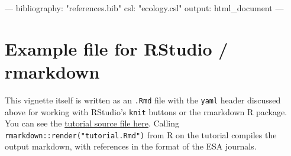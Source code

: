 \documentclass[]{article}
\newenvironment{Shaded}{\begin{snugshade}}{\end{snugshade}}
\newcommand{\StringTok}[1]{\textcolor[rgb]{0.31,0.60,0.02}{{#1}}}
\newcommand{\OtherTok}[1]{\textcolor[rgb]{0.56,0.35,0.01}{{#1}}}
\newcommand{\FunctionTok}[1]{\textcolor[rgb]{0.00,0.00,0.00}{{#1}}}
\newcommand{\NormalTok}[1]{{#1}}
\begin{document}
\begin{Shaded}
\begin{Highlighting}[]
\OtherTok{---}
\FunctionTok{bibliography:} \StringTok{"references.bib"}
\FunctionTok{csl:} \StringTok{"ecology.csl"}
\FunctionTok{output:}
  \NormalTok{html_document}
\OtherTok{---}
\end{Highlighting}
\end{Shaded}

\section{Example file for RStudio /
rmarkdown}\label{example-file-for-rstudio-rmarkdown}

This vignette itself is written as an \texttt{.Rmd} file with the
\texttt{yaml} header discussed above for working with RStudio's
\texttt{knit} buttons or the rmarkdown R package. You can see the
\href{https://raw.githubusercontent.com/cboettig/knitcitations/master/vignettes/tutorial.Rmd}{tutorial
source file here}. Calling \texttt{rmarkdown::render("tutorial.Rmd")}
from R on the tutorial compiles the output markdown, with references in
the format of the ESA journals.

\renewcommand\refname{References}

\end{document}
